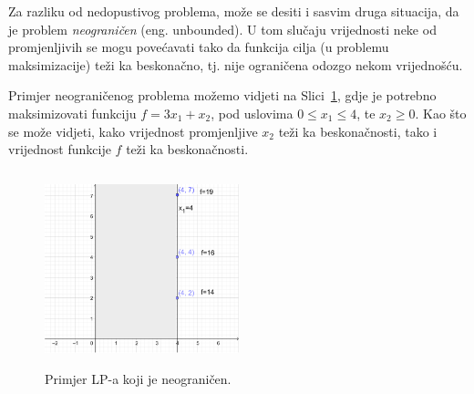 \documentclass[a4paper, utf8, 11pt, colorlinks]{book}
\theoremstyle{definition}
\begin{document}
 Za razliku od nedopustivog problema, može se desiti i sasvim druga situacija, da je problem \emph{neograničen} (eng. unbounded). U tom slučaju vrijednosti neke od promjenljivih se mogu povećavati tako da funkcija cilja (u problemu maksimizacije) teži ka beskonačno, tj. nije ograničena odozgo nekom vrijednošću. %
 
 Primjer neograničenog problema možemo vidjeti na Slici~\ref{fig:unbounded_solution}, gdje je potrebno maksimizovati funkciju $f = 3 x_1 + x_2$, pod uslovima $0\leq x_1 \leq 4$, te $x_2 \geq 0$. Kao što se može vidjeti,  kako vrijednost promjenljive $x_2$ teži ka beskonačnosti, tako i vrijednost funkcije $f$ teži ka beskonačnosti.
 
  \begin{figure}
     \centering
     \includegraphics[width=160pt, height=160pt]{fig4.eps}
     \caption{Primjer LP-a koji je neograničen.}
     \label{fig:unbounded_solution}
 \end{figure}
 
 

\end{document}
